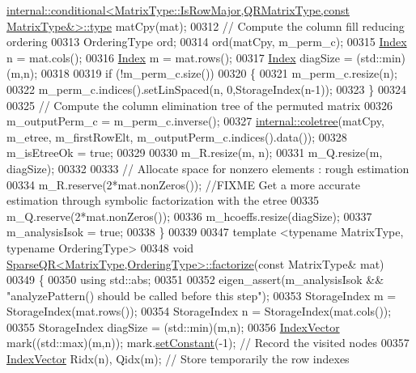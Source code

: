 \begin{DoxyCode}
      \hyperlink{class_eigen_1_1internal_1_1_tensor_lazy_evaluator_writable}{internal::conditional<MatrixType::IsRowMajor,QRMatrixType,const MatrixType&>::type}
       matCpy(mat);
00312   \textcolor{comment}{// Compute the column fill reducing ordering}
00313   OrderingType ord; 
00314   ord(matCpy, m\_perm\_c); 
00315   \hyperlink{namespace_eigen_a62e77e0933482dafde8fe197d9a2cfde}{Index} n = mat.cols();
00316   \hyperlink{namespace_eigen_a62e77e0933482dafde8fe197d9a2cfde}{Index} m = mat.rows();
00317   \hyperlink{namespace_eigen_a62e77e0933482dafde8fe197d9a2cfde}{Index} diagSize = (std::min)(m,n);
00318   
00319   \textcolor{keywordflow}{if} (!m\_perm\_c.size())
00320   \{
00321     m\_perm\_c.resize(n);
00322     m\_perm\_c.indices().setLinSpaced(n, 0,StorageIndex(n-1));
00323   \}
00324   
00325   \textcolor{comment}{// Compute the column elimination tree of the permuted matrix}
00326   m\_outputPerm\_c = m\_perm\_c.inverse();
00327   \hyperlink{namespace_eigen_1_1internal_a86181db74ba596a7afbfd89efcc5788c}{internal::coletree}(matCpy, m\_etree, m\_firstRowElt, m\_outputPerm\_c.indices().data());
00328   m\_isEtreeOk = \textcolor{keyword}{true};
00329   
00330   m\_R.resize(m, n);
00331   m\_Q.resize(m, diagSize);
00332   
00333   \textcolor{comment}{// Allocate space for nonzero elements : rough estimation}
00334   m\_R.reserve(2*mat.nonZeros()); \textcolor{comment}{//FIXME Get a more accurate estimation through symbolic factorization with
       the etree}
00335   m\_Q.reserve(2*mat.nonZeros());
00336   m\_hcoeffs.resize(diagSize);
00337   m\_analysisIsok = \textcolor{keyword}{true};
00338 \}
00339 
00347 \textcolor{keyword}{template} <\textcolor{keyword}{typename} MatrixType, \textcolor{keyword}{typename} OrderingType>
00348 \textcolor{keywordtype}{void} \hyperlink{group___sparse_q_r___module_a55a34bacf05bd30a1dacbccad9f03c6d}{SparseQR<MatrixType,OrderingType>::factorize}(\textcolor{keyword}{const} 
      MatrixType& mat)
00349 \{
00350   \textcolor{keyword}{using} std::abs;
00351   
00352   eigen\_assert(m\_analysisIsok && \textcolor{stringliteral}{"analyzePattern() should be called before this step"});
00353   StorageIndex m = StorageIndex(mat.rows());
00354   StorageIndex n = StorageIndex(mat.cols());
00355   StorageIndex diagSize = (std::min)(m,n);
00356   \hyperlink{group___core___module}{IndexVector} mark((std::max)(m,n)); mark.\hyperlink{class_eigen_1_1_plain_object_base_ac8dea1df3d92b752cc683ff42abf6f9b}{setConstant}(-1);  \textcolor{comment}{// Record the visited
       nodes}
00357   \hyperlink{group___core___module}{IndexVector} Ridx(n), Qidx(m);                             \textcolor{comment}{// Store temporarily the row indexes
}
\end{DoxyCode}

